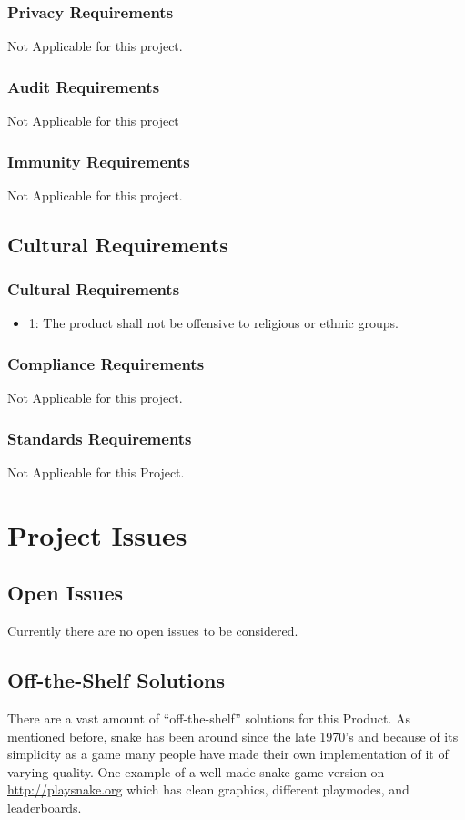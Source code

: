 \documentclass[12pt]{article}
\begin{document}
\subsubsection*{Privacy Requirements}
Not Applicable for this project.
\subsubsection*{Audit Requirements}
Not Applicable for this project
\subsubsection*{Immunity Requirements}
Not Applicable for this project.

\subsection{Cultural Requirements}

\subsubsection*{Cultural Requirements}
\begin{itemize}
\item 1: The product shall not be offensive to religious or ethnic groups.
\end{itemize}

\subsubsection*{Compliance Requirements}
Not Applicable for this project.
\subsubsection*{Standards Requirements}
Not Applicable for this Project.

\section*{Project Issues}

\subsection{Open Issues}
	Currently there are no open issues to be considered.
\subsection{Off-the-Shelf Solutions}
	There are a vast amount of “off-the-shelf” solutions for this Product. As mentioned before, snake has been around since the late 1970’s and because of its simplicity as a game many people have made their own implementation of it of varying quality. One example of a well made snake game version on  \url{http://playsnake.org} which has clean graphics, different playmodes, and leaderboards.
	
\end{document}
